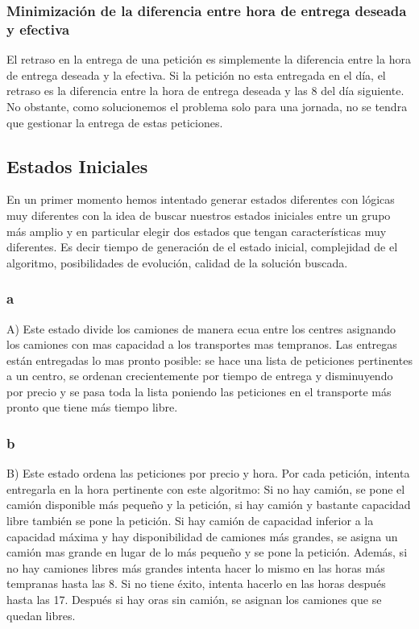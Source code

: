 \documentclass{article}
\begin{document}
\subsubsection{Minimización de la diferencia entre hora de entrega deseada y
efectiva}
El retraso en la entrega de una petición es simplemente la diferencia entre la
hora de entrega deseada y la efectiva. Si la petición no esta entregada en el
día, el retraso es la diferencia entre la hora de entrega deseada y las 8 del
día siguiente. No obstante, como solucionemos el problema solo para una jornada,
no se tendra que gestionar la entrega de estas peticiones.

\subsection{Estados Iniciales}

En un primer momento hemos intentado generar estados diferentes con lógicas muy diferentes con la idea de buscar nuestros estados iniciales entre un grupo más amplio y en particular elegir dos estados que tengan características muy diferentes. Es decir tiempo de generación de el estado inicial, complejidad de el algoritmo, posibilidades de evolución, calidad de la solución buscada.

\subsubsection{a}
A) Este estado divide los camiones de manera ecua entre los centres asignando los camiones con mas capacidad a los transportes mas tempranos. Las entregas están entregadas lo mas pronto posible: se hace una lista de peticiones pertinentes a un centro, se ordenan crecientemente por tiempo de entrega y disminuyendo por precio y se pasa toda la lista poniendo las peticiones en el transporte más pronto que tiene más tiempo libre.

\subsubsection{b}
B) Este estado ordena las peticiones por precio y hora. Por cada petición, intenta entregarla en la hora pertinente con este algoritmo:
Si no hay camión, se pone el camión disponible más pequeño y la petición, si hay camión y bastante capacidad libre también se pone la petición. Si hay camión de capacidad inferior a la capacidad máxima y hay disponibilidad de camiones más grandes, se asigna un camión mas grande en lugar de lo más pequeño y se pone la petición. Además, si no hay camiones libres más grandes intenta hacer lo mismo en las horas más tempranas hasta las 8. Si no tiene éxito, intenta hacerlo en las horas después hasta las 17.
Después si hay oras sin camión, se asignan los camiones que se quedan libres.
\end{document}
